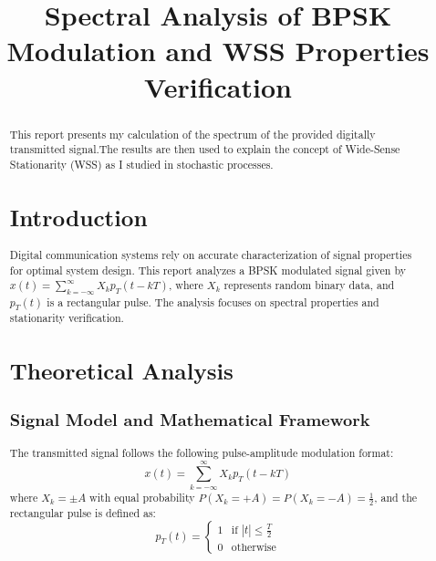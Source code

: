 \documentclass[conference]{IEEEtran}
\begin{document}
\title{Spectral Analysis of BPSK Modulation and WSS Properties Verification}

\author{
}

\maketitle


\begin{abstract}
This report presents my calculation of the spectrum of the provided digitally transmitted signal.The results are then used to explain the concept of Wide-Sense Stationarity (WSS) as I studied in stochastic processes.

\section{Introduction}
Digital communication systems rely on accurate characterization of signal properties for optimal system design. This report analyzes a BPSK modulated signal given by $x(t) = \sum_{k=-\infty}^{\infty} X_k p_T(t-kT)$, where $X_k$ represents random binary data, and $p_T(t)$ is a rectangular pulse. The analysis focuses on spectral properties and stationarity verification.

\section{Theoretical Analysis}

\subsection{Signal Model and Mathematical Framework}
The transmitted signal follows the following pulse-amplitude modulation format:
\begin{equation}
x(t) = \sum_{k=-\infty}^{\infty} X_k p_T(t-kT)
\end{equation}
where $X_k = \pm A$ with equal probability $P(X_k = +A) = P(X_k = -A) = \frac{1}{2}$, and the rectangular pulse is defined as:
\begin{equation}
p_T(t) = \begin{cases} 
1 & \text{if } |t| \leq \frac{T}{2} \\
0 & \text{otherwise}
\end{cases}
\end{equation}


\end{abstract}
\end{document}

